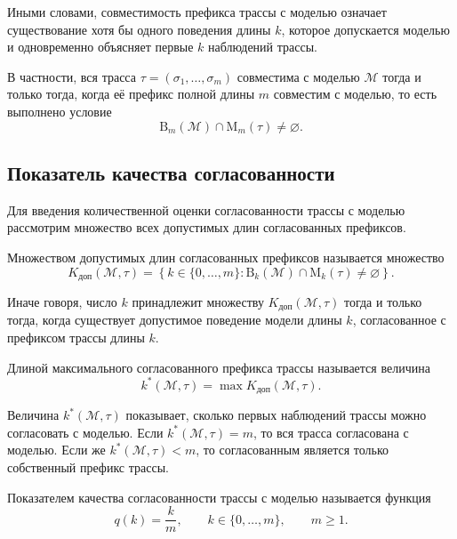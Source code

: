 Иными словами, совместимость префикса трассы с моделью означает существование
хотя бы одного поведения длины $k$, которое допускается моделью и одновременно
объясняет первые $k$ наблюдений трассы.

В частности, вся трасса $\tau = (\sigma_1,\dots,\sigma_m)$ совместима с моделью
$\mathcal{M}$ тогда и только тогда, когда её префикс полной длины $m$
совместим с моделью, то есть выполнено условие
\begin{equation}\label{f8b}
\mathrm{B}_m(\mathcal{M}) \cap \mathrm{M}_m(\tau) \neq \varnothing.
\end{equation}

\subsection{Показатель качества согласованности}

Для введения количественной оценки согласованности трассы с моделью рассмотрим
множество всех допустимых длин согласованных префиксов.

\begin{definition}\label{def:K}
Множеством допустимых длин согласованных префиксов называется множество
\begin{equation}\label{f9}
K_{\mathrm{доп}}(\mathcal{M},\tau)
=
\left\{
k \in \{0,\dots,m\}
:
\mathrm{B}_k(\mathcal{M}) \cap \mathrm{M}_k(\tau) \neq \varnothing
\right\}.
\end{equation}
\end{definition}

Иначе говоря, число $k$ принадлежит множеству
$K_{\mathrm{доп}}(\mathcal{M},\tau)$ тогда и только тогда, когда существует
допустимое поведение модели длины $k$, согласованное с префиксом трассы длины
$k$.

\begin{definition}\label{def:k_max}
Длиной максимального согласованного префикса трассы называется величина
\begin{equation}\label{f10}
k^*(\mathcal{M},\tau)
=
\max K_{\mathrm{доп}}(\mathcal{M},\tau).
\end{equation}
\end{definition}

Величина $k^*(\mathcal{M},\tau)$ показывает, сколько первых наблюдений трассы
можно согласовать с моделью. Если $k^*(\mathcal{M},\tau)=m$, то вся трасса
согласована с моделью. Если же $k^*(\mathcal{M},\tau)<m$, то согласованным
является только собственный префикс трассы.

\begin{definition}
Показателем качества согласованности трассы с моделью называется функция
\begin{equation}\label{f11}
q(k)=\frac{k}{m},
\qquad
k \in \{0,\dots,m\},
\qquad
m \ge 1.
\end{equation}
\end{definition}

